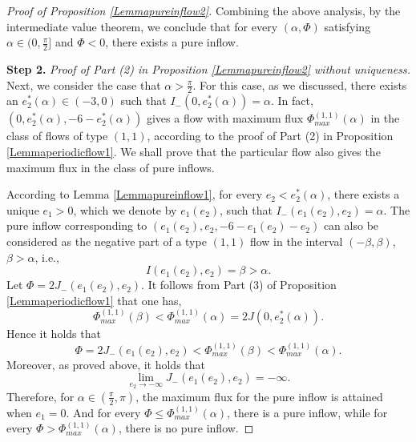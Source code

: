 \documentclass[reqno,12pt]{amsart}
\begin{document}
\begin{proof}[Proof of Proposition \ref{Lemmapureinflow2}]
Combining the above analysis, by the intermediate value theorem, we conclude that {for every $(\alpha, \Phi)$ satisfying $\alpha \in (0, \frac{\pi}{2}]$ and  $\Phi < 0$, there exists a pure inflow. }

\vspace{2mm}

{\bf Step 2.} {\it Proof of Part (2) in Proposition \ref{Lemmapureinflow2} without uniqueness.}
Next, we consider the case that $\alpha > \frac{\pi}{2}$. For this case, as we discussed, there exists an $e_2^*(\alpha)\in (-3,0)$ such that $I_{-} (0, e_2^*(\alpha)) = \alpha$. In fact, $(0, e_2^*(\alpha), -6-e_2^*(\alpha))$ gives a flow with maximum flux $\Phi_{max}^{(1, 1)}(\alpha)$ in the class of flows of type $(1,1)$, according to the proof of Part (2) in Proposition \ref{Lemmaperiodicflow1}.  We shall prove that the particular flow also gives the maximum flux in the class of pure inflows.

According to Lemma \ref{Lemmapureinflow1}, for every $e_2 < e_2^*(\alpha)$, there exists a unique $e_1>0$, which we denote by $e_1(e_2)$, such that $I_{-}(e_1(e_2), e_2) = \alpha$. The pure inflow corresponding to $(e_1(e_2), e_2, -6-e_1(e_2)-e_2)$ can also be considered  as the negative part of a type $(1, 1)$ flow in the interval $(-\beta, \beta)$, $\beta> \alpha$, i.e., 
\begin{equation*}
    I(e_1(e_2), e_2) = \beta >\alpha.
\end{equation*}
Let $\Phi=2 J_-(e_1(e_2),e_2).$
It follows from Part (3) of Proposition  \ref{Lemmaperiodicflow1} that one has, 
\begin{equation}\nonumber
    \Phi_{max}^{(1,1)}(\beta) < \Phi_{max}^{(1, 1)}(\alpha) = 2J (0, e_2^*(\alpha)). 
\end{equation}
Hence it holds that  
\begin{equation}\nonumber
    \Phi = 2 J_{-}(e_1(e_2),e_2) <\Phi_{max}^{(1, 1)}(\beta) < \Phi_{max}^{(1, 1)}(\alpha). 
\end{equation}
Moreover, as proved above, it holds that 
\begin{equation*}
    \lim_{e_2 \to -\infty} J_{-}(e_1(e_2), e_2) = -\infty.
\end{equation*}
Therefore, for $\alpha\in (\frac{\pi}{2}, \pi)$, the maximum flux for the pure inflow is attained when $e_1 =0$. And for every $\Phi \leq  \Phi_{max}^{(1, 1)}(\alpha)$, there is a pure inflow, while for every $\Phi>\Phi^{(1,1)}_{max}(\alpha)$, there is no pure inflow.



\end{proof}
\end{document}

